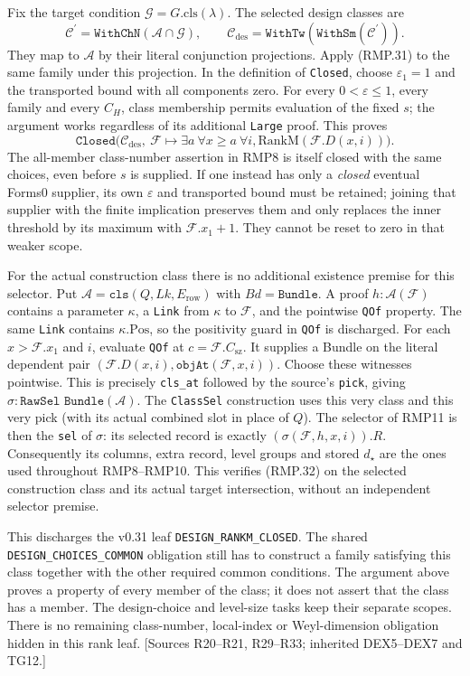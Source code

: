 Fix the target condition $\mathcal G=G.\mathrm{cls}(\lambda)$.
The selected design classes are
\[
 \mathcal C^{\prime}=\texttt{WithChN}(\mathcal A\cap\mathcal G),
 \qquad
 \mathcal C_{\mathrm{des}}=\texttt{WithTw}(\texttt{WithSm}
                 (\mathcal C^{\prime})).
\]
They map to $\mathcal A$ by their literal conjunction projections. Apply (RMP.31) to the same family
under this projection. In the definition of \texttt{Closed}, choose
$\varepsilon_1=1$ and the transported bound with all components zero.
For every $0<\varepsilon\le1$, every family and every $C_H$,
class membership permits evaluation of the fixed $s$; the argument works regardless of
its additional \texttt{Large} proof. This proves
\[
 \texttt{Closed}\bigl(\mathcal C_{\mathrm{des}},\
   \mathcal F\mapsto
     \exists a\ \forall x\ge a\ \forall i,
                     \mathrm{RankM}(\mathcal F.D(x,i))\bigr).
                                                               \tag{RMP.32}
\]
The all-member class-number assertion in RMP8 is itself closed
with the same choices, even before $s$ is supplied.
If one instead has only a \emph{closed} eventual Forms0 supplier,
its own $\varepsilon$ and transported bound must be retained;
joining that supplier with the finite implication preserves them
and only replaces the inner threshold by its maximum with
$\mathcal F.x_1+1$. They cannot be reset to zero in that weaker scope.

For the actual construction class there is no additional existence
premise for this selector. Put
$\mathcal A=\texttt{cls}(Q,Lk,E_{\mathrm{row}})$ with
$Bd=\texttt{Bundle}$. A proof $h:\mathcal A(\mathcal F)$
contains a parameter $\kappa$, a \texttt{Link} from $\kappa$ to
$\mathcal F$, and the pointwise \texttt{QOf} property.
The same \texttt{Link} contains $\kappa.\mathrm{Pos}$, so the
positivity guard in \texttt{QOf} is discharged. For each
$x>\mathcal F.x_1$ and $i$, evaluate \texttt{QOf} at
$c=\mathcal F.C_{\mathrm{sz}}$. It supplies a Bundle on the
literal dependent pair
$(\mathcal F.D(x,i),\texttt{objAt}(\mathcal F,x,i))$.
Choose these witnesses pointwise. This is precisely
\texttt{cls\_at} followed by the source's \texttt{pick}, giving
$\sigma:\texttt{RawSel Bundle}(\mathcal A)$.
The \texttt{ClassSel} construction uses this very class and this
very pick (with its actual combined slot in place of $Q$).
The selector of RMP11 is then the \texttt{sel} of $\sigma$:
its selected record is exactly $(\sigma(\mathcal F,h,x,i)).R$.
Consequently its columns, extra record, level groups and stored
$d_\star$ are the ones used throughout RMP8--RMP10.
This verifies (RMP.32) on the selected construction class and its
actual target intersection, without an independent selector premise.

This discharges the v0.31 leaf \texttt{DESIGN\_RANKM\_CLOSED}.
The shared \texttt{DESIGN\_CHOICES\_COMMON} obligation still has
to construct a family satisfying this class together with the
other required common conditions. The argument above proves a
property of every member of the class; it does not assert that
the class has a member. The design-choice and level-size tasks
keep their separate scopes. There is no remaining class-number,
local-index or Weyl-dimension obligation hidden in this rank leaf.
[Sources R20--R21, R29--R33; inherited DEX5--DEX7 and TG12.]
